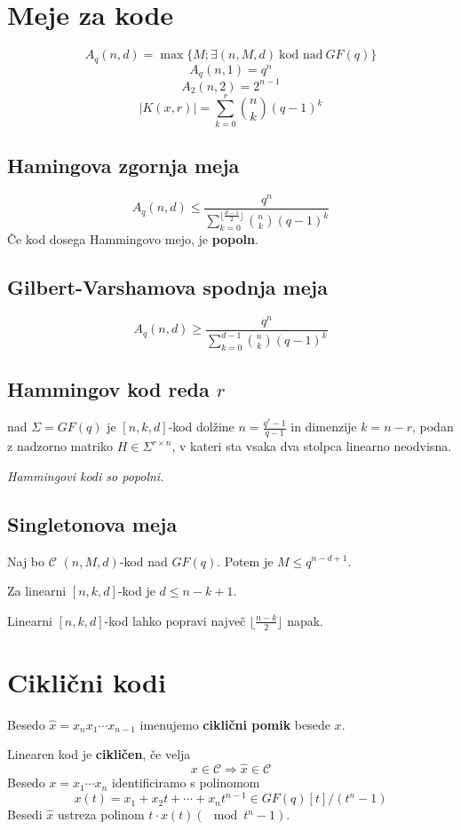 \begin{multicols}{5}
\section{Meje za kode}
\[ A_q(n, d) = \max\{M; \exists (n,M,d)\ \text{kod nad}\ GF(q)\}\]
\[ A_q(n,1) = q^n\]
\[ A_2(n,2) = 2^{n-1}\]
\[|K(x,r)|=\sum_{k=0}^r\binom{n}{k}(q-1)^k\]

\subsection{Hamingova zgornja meja}
\[A_q(n,d) \le \frac{q^n}{\sum_{k=0}^{\lfloor\frac{d-1}{2}\rfloor}\binom{n}{k}(q-1)^k}\]
Če kod dosega Hammingovo mejo, je \textbf{popoln}.

\subsection{Gilbert-Varshamova spodnja meja}
\[A_q(n,d) \ge \frac{q^n}{\sum_{k=0}^{d-1}\binom{n}{k}(q-1)^k}\]

\subsection{Hammingov kod reda $r$}
nad $\Sigma = GF(q)$ je $[n,k,d]$-kod dolžine $n=\frac{q^r-1}{q-1}$ in dimenzije $k = n-r$, podan z
nadzorno matriko $H \in \Sigma^{r\times n}$, v kateri sta vsaka dva stolpca linearno neodvisna.

\textit{Hammingovi kodi so popolni.}

\subsection{Singletonova meja}
Naj bo $\mathcal{C}$ $(n,M,d)$-kod nad $GF(q)$. Potem je $M \le q^{n-d+1}$.


Za linearni $[n,k,d]$-kod je $d\le n-k+1$.

Linearni $[n,k,d]$-kod lahko popravi največ $\lfloor\frac{n-k}{2}\rfloor$ napak.
\section{Ciklični kodi}
Besedo $\hat{x} =x_nx_1\cdots x_{n-1}$ imenujemo \textbf{ciklični pomik} besede $x$.

Linearen kod je \textbf{cikličen}, če velja
\[x\in\mathcal{C}\Rightarrow\hat{x}\in\mathcal{C}\]
Besedo $x=x_1\cdots x_n$ identificiramo s polinomom 
\[x(t) = x_1+x_2t+\cdots +x_nt^{n-1}\in GF(q)[t]/(t^n-1) \]
Besedi $\hat{x}$ ustreza polinom $t\cdot x(t)(\mod t^n-1)$.


\end{multicols}
